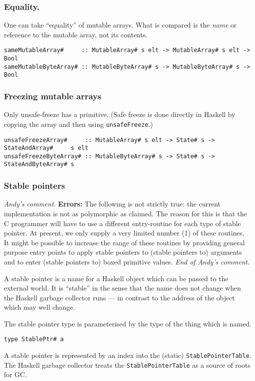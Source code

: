 \subsubsection{Equality.}

One can take ``equality'' of mutable arrays.  What is compared is the
{\em name} or reference to the mutable array, not its contents.
\begin{verbatim}
sameMutableArray#     :: MutableArray# s elt -> MutableArray# s elt -> Bool
sameMutableByteArray# :: MutableByteArray# s -> MutableByteArray# s -> Bool
\end{verbatim}

\subsubsection{Freezing mutable arrays}

Only unsafe-freeze has a primitive.  (Safe freeze is done directly in Haskell 
by copying the array and then using \mbox{\tt unsafeFreeze}.) 
\begin{verbatim}
unsafeFreezeArray#     :: MutableArray# s elt -> State# s -> StateAndArray#     s elt
unsafeFreezeByteArray# :: MutableByteArray# s -> State# s -> StateAndByteArray# s
\end{verbatim}

\subsubsection{Stable pointers}

{\em Andy's comment.} {\bf Errors:} The following is not strictly true: the current
implementation is not as polymorphic as claimed.  The reason for this
is that the C programmer will have to use a different entry-routine
for each type of stable pointer.  At present, we only supply a very
limited number (1) of these routines.  It might be possible to
increase the range of these routines by providing general purpose
entry points to apply stable pointers to (stable pointers to)
arguments and to enter (stable pointers to) boxed primitive values.
{\em End of Andy's comment.}

A stable pointer is a name for a Haskell object which can be passed to the 
external world.  It is ``stable'' in the sense that the name does not change when 
the Haskell garbage collector runs --- in contrast to the address of the object 
which may well change.

The stable pointer type is parameterised by the type of the thing which is named.
\begin{verbatim}
type StablePtr# a
\end{verbatim}
A stable pointer is represented by an index into the (static) 
\mbox{\tt StablePointerTable}.  The Haskell garbage collector treats the 
\mbox{\tt StablePointerTable} as a source of roots for GC.

